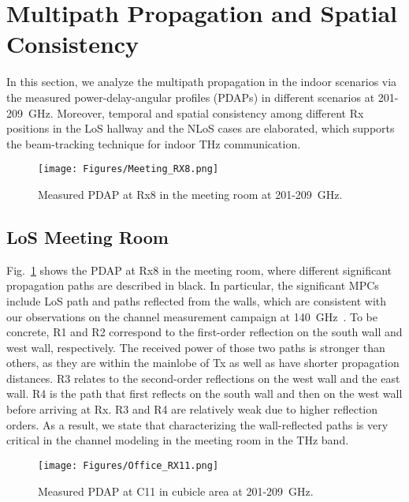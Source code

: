 \documentclass[journal,12pt,draftclsnofoot,onecolumn]{IEEEtran}
\begin{document}
\section{Multipath Propagation and Spatial Consistency} \label{Sec:MPCsandSpatialConsistency}
In this section, we analyze the multipath propagation in the indoor scenarios via the measured power-delay-angular profiles (PDAPs) in different scenarios at 201-209~GHz. Moreover, temporal and spatial consistency among different Rx positions in the LoS hallway and the NLoS cases are elaborated, which supports the beam-tracking technique for indoor THz communication.

\begin{figure}
\centering
\texttt{[image: Figures/Meeting\_RX8.png]}
\caption{Measured PDAP at Rx8 in the meeting room at 201-209~GHz.}
\label{fig:meeting_rx8}
\end{figure}

\subsection{LoS Meeting Room}
Fig.~\ref{fig:meeting_rx8} shows the PDAP at Rx8 in the meeting room, where different significant propagation paths are described in black. In particular, the significant MPCs include LoS path and paths reflected from the walls, which are consistent with our observations on the channel measurement campaign at 140~GHz~\cite{yi2021Channel}. To be concrete, R1 and R2 correspond to the first-order reflection on the south wall and west wall, respectively. The received power of those two paths is stronger than others, as they are within the mainlobe of Tx as well as have shorter propagation distances. R3 relates to the second-order reflections on the west wall and the east wall. R4 is the path that first reflects on the south wall and then on the west wall before arriving at Rx. R3 and R4 are relatively weak due to higher reflection orders. As a result, we state that characterizing the wall-reflected paths is very critical in the channel modeling in the meeting room in the THz band.


\begin{figure}
\centering
\texttt{[image: Figures/Office\_RX11.png]}
\caption{Measured PDAP at C11 in cubicle area at 201-209~GHz.}
\label{fig:meeting_rx11}
\end{figure}
\end{document}
